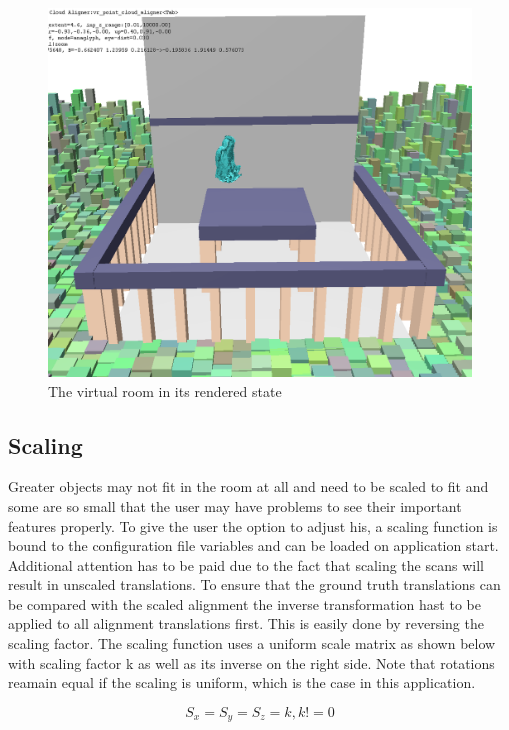 \documentclass[hyperref,english,bachelorofscience,bibnum,twoside]{cgvpub}
\begin{document}
\begin{figure}[htbp]
	\centering
		\includegraphics[width= \linewidth]{vrroom.png}
	\caption{The virtual room in its rendered state}
	\label{fig:room}
\end{figure}


 
\subsection{Scaling}

Greater objects may not fit in the room at all and need to be scaled to fit and some are so small that the user may have problems to see their important features properly. To give the user the option to adjust his, a scaling function is bound to the configuration file variables and can be loaded on application start. Additional attention has to be paid due to the fact that scaling the scans will result in unscaled translations. To ensure that the ground truth translations can be compared with the scaled alignment the inverse transformation hast to be applied to all alignment translations first. This is easily done by reversing the scaling factor. The scaling function uses a uniform scale matrix as shown below with scaling factor k as well as its inverse on the right side. Note that rotations reamain equal if the scaling is uniform, which is the case in this application.

\[
S_x = S_y = S_z = k,  k != 0
\]
\end{document}
